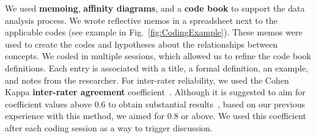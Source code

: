 We used \textbf{memoing}, \textbf{affinity diagrams}, and a \textbf{code book} to support the data analysis process. We wrote reflective memos in a spreadsheet next to the applicable codes (see example in Fig.~\ref{fig:CodingExample}). These memos were used to create the codes and hypotheses about the relationships between concepts. We coded in multiple sessions, which allowed us to refine the code book definitions. Each entry is associated with a title, a formal definition, an example, and notes from the researcher. %
For inter-rater reliability, we used the Cohen Kappa \textbf{inter-rater agreement} coefficient~\cite{Stemler2004}. Although it is suggested to aim for coefficient values above 0.6 to obtain substantial results~\cite{Landis1977}, based on our previous experience with this method, we aimed for 0.8 or above. We used this coefficient after each coding session as a way to trigger discussion.






